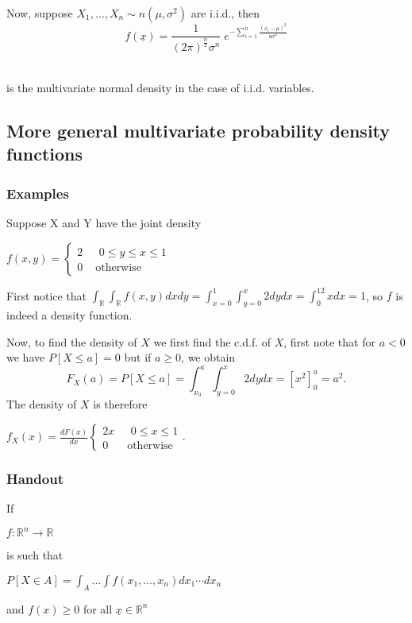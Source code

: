 \documentclass[12pt,a4paper]{article}
\theoremstyle{regla}
\theoremstyle{remark}
\theoremstyle{definition}
\theoremstyle{nonumberbreak}
\begin{document}
Now, suppose $X_1,\ldots,X_n\sim n(\mu,\sigma^2)$ are i.i.d., then\\
$$f(\underline{x})=\frac{1}{(2\pi)^\frac{n}{2}\sigma^n}\; e^{-\displaystyle\sum^{n}_{i=1} \frac{(x_i-\mu)^2}{a\sigma^2}}$$

\\
is the multivariate normal density in the case of i.i.d. variables.


\subsection{More general multivariate probability density functions}
\subsubsection{Examples}
\begin{xmpl}
 Suppose X and Y have the joint density


$ f(x,y) =
\begin{cases}
2 & \text{   } 0\leq y \leq x \leq 1\\
0 & \text{   otherwise}
\end{cases}$

First notice that $\int_{\mathbb{R}}\int_{\mathbb{R}}f(x,y)dxdy=\int_{x=0}^1\int_{y=0}^x2dydx=\int_0^12xdx=1$, so $f$ is indeed a density function. 

Now, to find the density of $X$ we first find the c.d.f. of $X$, first note that for $a<0$ we have $P[X\leq a]=0$ but if $a\geq 0$, we obtain
$$F_X(a)=P[X\leq a]=\int_{x_0}^a\int_{y=0}^x2dydx=[x^2]_0^a=a^2.$$
The density of $X$ is therefore

$ f_X(x) = \frac{dF(x)}{dx}
\begin{cases}
2x & \text{   } 0\leq x \leq 1\\
0 & \text{   otherwise}
\end{cases}.$
\end{xmpl}

\subsubsection{Handout}
If

$ f: \mathbb{R}^n\rightarrow\mathbb{R}$

is such that

$P[X \in A] = \int_A\ldots\int f(x_1,\ldots, x_n)dx_1\cdots dx_n$

and $f(x)\geq 0$ for all $\underline{x}\in \mathbb{R}^n$
\end{document}

